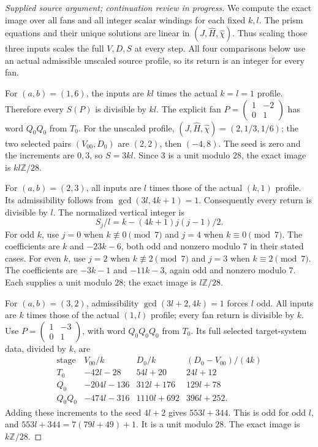 \begin{proof}[Supplied source argument; continuation review in progress]
We compute the exact image over all fans
and all integer scalar windings for
each fixed \(k,l\).
The prism equations and their unique
solutions are linear in
\((J,\widehat H,\widehat\chi)\).
Thus scaling those three inputs scales
the full \(V,D,S\) at every step.
All four comparisons below use an actual
admissible unscaled source profile, so
its return is an integer for every fan.

For \((a,b)=(1,6)\), the inputs are
\(kl\) times the actual \(k=l=1\)
profile. Therefore every \(S(P)\)
is divisible by \(kl\).
The explicit fan
\(P=\left(\begin{smallmatrix}1&-2\\0&1\end{smallmatrix}\right)\)
has word \(Q_0Q_0\) from \(T_0\).
For the unscaled profile,
\((J,\widehat H,\widehat\chi)=(2,1/3,1/6)\);
the two selected pairs \((V_{00},D_0)\)
are \((2,2)\), then \((-4,8)\).
The seed is zero and the increments
are \(0,3\), so \(S=3kl\).
Since \(3\) is a unit modulo \(28\),
the exact image is \(kl\mathbb Z/28\).

For \((a,b)=(2,3)\), all inputs are
\(l\) times those of the actual
\((k,1)\) profile. Its admissibility
follows from
\(\gcd(3l,4k+1)=1\).
Consequently every return is divisible
by \(l\). The normalized vertical
integer is
\[
 S_j/l=k-(4k+1)j(j-1)/2.
 \tag{RJC.81}
\]
For odd \(k\), use \(j=0\) when
\(k\not\equiv0\pmod7\) and \(j=4\)
when \(k\equiv0\pmod7\).
The coefficients are \(k\) and
\(-23k-6\), both odd and nonzero
modulo \(7\) in their stated cases.
For even \(k\), use \(j=2\) when
\(k\not\equiv2\pmod7\) and \(j=3\)
when \(k\equiv2\pmod7\).
The coefficients are \(-3k-1\)
and \(-11k-3\), again odd and
nonzero modulo \(7\).
Each supplies a unit modulo \(28\);
the exact image is \(l\mathbb Z/28\).

For \((a,b)=(3,2)\), admissibility
\(\gcd(3l+2,4k)=1\) forces \(l\)
odd. All inputs are \(k\) times
those of the actual \((1,l)\)
profile; every fan return is
divisible by \(k\).
Use
\(P=\left(\begin{smallmatrix}1&-3\\0&1\end{smallmatrix}\right)\),
with word \(Q_0Q_0Q_0\) from \(T_0\).
Its full selected target-system data,
divided by \(k\), are
\[
 \begin{array}{c|c|c|c}
 \text{stage}&V_{00}/k&D_0/k&(D_0-V_{00})/(4k)\\ \hline
 T_0&-42l-28&54l+20&24l+12\\
 Q_0&-204l-136&312l+176&129l+78\\
 Q_0Q_0&-474l-316&1110l+692&396l+252.
 \end{array}
 \tag{RJC.82}
\]
Adding these increments to the seed
\(4l+2\) gives \(553l+344\).
This is odd for odd \(l\), and
\(553l+344=7(79l+49)+1\).
It is a unit modulo \(28\).
The exact image is \(k\mathbb Z/28\).


\end{proof}

